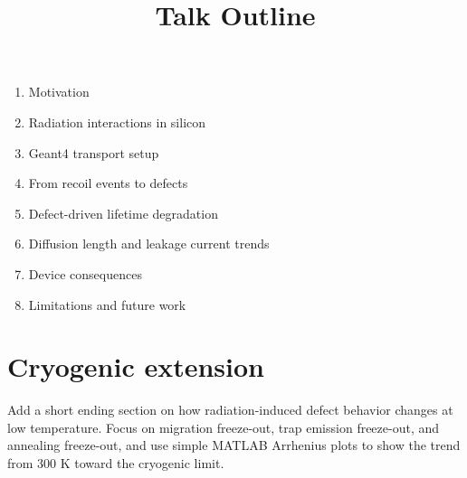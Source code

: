 \documentclass[11pt]{article}
\title{Talk Outline}
\begin{document}
\maketitle

\begin{enumerate}
    \item Motivation
    \item Radiation interactions in silicon
    \item Geant4 transport setup
    \item From recoil events to defects
    \item Defect-driven lifetime degradation
    \item Diffusion length and leakage current trends
    \item Device consequences
    \item Limitations and future work
\end{enumerate}


\section*{Cryogenic extension}
Add a short ending section on how radiation-induced defect behavior changes at low temperature. Focus on migration freeze-out, trap emission freeze-out, and annealing freeze-out, and use simple MATLAB Arrhenius plots to show the trend from 300 K toward the cryogenic limit.
\end{document}
